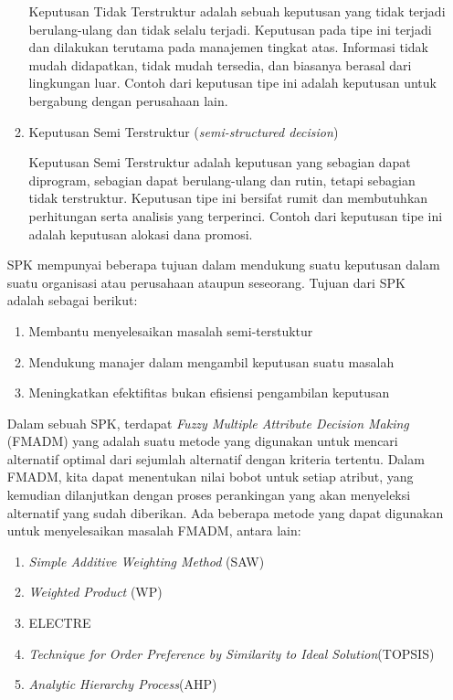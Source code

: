 \documentclass[a4paper,twoside]{article}
\begin{document}
\begin{enumerate}
\begin{enumerate}
		Keputusan Tidak Terstruktur adalah sebuah keputusan yang tidak terjadi berulang-ulang dan tidak selalu terjadi. Keputusan pada tipe ini terjadi dan dilakukan terutama pada manajemen tingkat atas. Informasi tidak mudah didapatkan, tidak mudah tersedia, dan biasanya berasal dari lingkungan luar. Contoh dari keputusan tipe ini adalah keputusan untuk bergabung dengan perusahaan lain.
		\item Keputusan Semi Terstruktur (\textit{semi-structured decision})
		
		Keputusan Semi Terstruktur adalah keputusan yang sebagian dapat diprogram, sebagian dapat berulang-ulang dan rutin, tetapi sebagian tidak terstruktur. Keputusan tipe ini bersifat rumit dan membutuhkan perhitungan serta analisis yang terperinci. Contoh dari keputusan tipe ini adalah keputusan alokasi dana promosi.
	\end{enumerate}
	
	SPK mempunyai beberapa tujuan dalam mendukung suatu keputusan dalam suatu organisasi atau perusahaan ataupun seseorang. Tujuan dari SPK adalah sebagai berikut:
	
	\begin{enumerate}
		\item Membantu menyelesaikan masalah semi-terstuktur
		\item Mendukung manajer dalam mengambil keputusan suatu masalah
		\item Meningkatkan efektifitas bukan efisiensi pengambilan keputusan
	\end{enumerate}

	Dalam sebuah SPK, terdapat \textit{Fuzzy Multiple Attribute Decision Making} (FMADM) yang adalah suatu metode yang digunakan untuk mencari alternatif optimal dari sejumlah alternatif dengan kriteria tertentu. Dalam FMADM, kita dapat menentukan nilai bobot untuk setiap atribut, yang kemudian dilanjutkan dengan proses perankingan yang akan menyeleksi alternatif yang sudah diberikan. Ada beberapa metode yang dapat digunakan untuk menyelesaikan masalah FMADM, antara lain:
	
	\begin{enumerate}
		\item \textit{Simple Additive Weighting Method} (SAW)
		\item \textit{Weighted Product} (WP)
		\item ELECTRE
		\item \textit{Technique for Order Preference by Similarity to Ideal Solution}(TOPSIS)
		\item \textit{Analytic Hierarchy Process}(AHP)
	\end{enumerate}
	

\end{enumerate}
\end{document}
